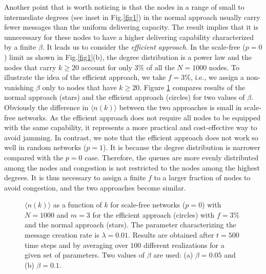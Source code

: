 \documentclass[aps,prl,twocolumn,superscriptaddress,showpacs]{revtex4}
\begin{document}
Another point that is worth noticing is that the nodes in a range
of small to intermediate degrees (see inset in Fig.\ref{fig1}) in
the normal approach usually carry fewer messages than the uniform
delivering capacity.  The result implies that it is unnecessary
for these nodes to have a higher delivering capability
characterized by a finite $\beta$.  It leads us to consider the
{\em efficient approach}.  In the scale-free ($p=0$) limit as
shown in Fig.\ref{fig1}(b), the degree distribution is a power
law and the nodes that carry $k \ge 20$ account for only $3\%$ of
all the $N=1000$ nodes.  To illustrate the idea of the efficient
approach, we take $f = 3\%$, i.e., we assign a non-vanishing
$\beta$ only to nodes that have $k \ge 20$.  Figure \ref{fig2}
compares results of the normal approach (stars) and the efficient
approach (circles) for two values of $\beta$.  Obviously the
difference in $\langle n(k) \rangle$ between the two approaches
is small in scale-free networks.  As the efficient approach does
not require all nodes to be equipped with the same capability, it
represents a more practical and cost-effective way to avoid
jamming.  In contrast, we note that the efficient approach does
not work so well in random networks ($p=1$).  It is because the
degree distribution is narrower compared with the $p=0$ case.
Therefore, the queues are more evenly distributed among the nodes
and congestion is not restricted to the nodes among the highest
degrees.  It is thus necessary to assign a finite $f$ to a larger
fraction of nodes to avoid congestion, and the two approaches
become similar.

\begin{figure}
\begin{center}
 \caption{$\langle
n(k) \rangle$ as a function of $k$ for scale-free networks ($p=0$)
with $N=1000$ and $m=3$ for the efficient approach (circles) with
$f=3\%$ and the normal approach (stars).   The parameter
characterizing the message creation rate is $\lambda=0.01$.
Results are obtained after $t=500$ time steps and by averaging
over $100$ different realizations for a given set of parameters.
Two values of $\beta$ are used: (a) $\beta = 0.05$ and (b) $\beta
= 0.1$.} \label{fig2}
\end{center}
\end{figure}
\end{document}
